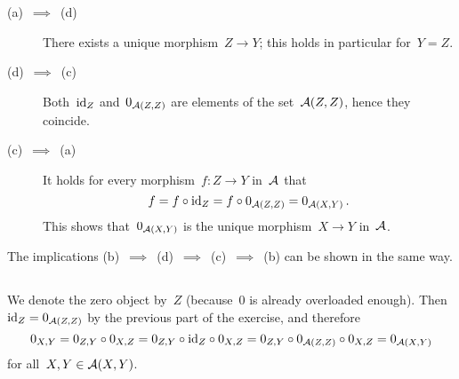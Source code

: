 \section{}





\subsection{}

\begin{description}
  \item[(a)~$\implies$~(d)]
    There exists a unique morphism~$Z \to Y$;
    this holds in particular for~$Y = Z$.
  \item[(d)~$\implies$~(c)]
    Both~$\operatorname{id}_Z$ and~$0_{\mathcal{A}(Z,Z)}$ are elements of the  set~$\mathcal{A}(Z,Z)$, hence they coincide.
  \item[(c)~$\implies$~(a)]
    It holds for every morphism~$f \colon Z \to Y$ in~$\mathcal{A}$ that
    \[
        f
      = f \circ {\operatorname{id}_Z}
      = f \circ 0_{\mathcal{A}(Z,Z)}
      = 0_{\mathcal{A}(X,Y)} \,.
    \]
    This shows that~$0_{\mathcal{A}(X,Y)}$ is the unique morphism~$X \to Y$ in~$\mathcal{A}$.
\end{description}
The implications (b)~$\implies$~(d)~$\implies$~(c)~$\implies$~(b) can be shown in the same way.





\subsection{}

We denote the zero object by~$Z$ (because~$0$ is already overloaded enough).
Then~$\operatorname{id}_Z = 0_{\mathcal{A}(Z,Z)}$ by the previous part of the exercise, and therefore
\[
    0_{X,Y}
  = 0_{Z,Y} \circ 0_{X,Z}
  = 0_{Z,Y} \circ {\operatorname{id}_Z} \circ 0_{X,Z}
  = 0_{Z,Y} \circ 0_{\mathcal{A}(Z,Z)} \circ 0_{X,Z}
  = 0_{\mathcal{A}(X,Y)}
\]
for all~$X, Y \in \mathcal{A}(X,Y)$.




